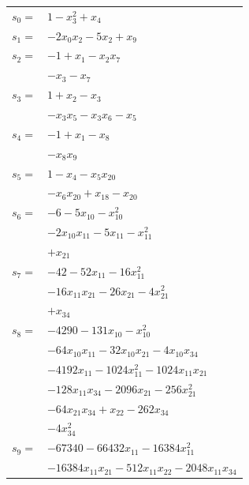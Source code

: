 \begingroup
\small
\setlength{\tabcolsep}{2pt}
\setlength{\LTleft}{0pt}
\begin{longtable}{@{}r@{\;}l@{}}
\(s_{0}=\) & \(\displaystyle 1 -x_{3}^{2} +x_{4}\) \\[3pt]
\(s_{1}=\) & \(\displaystyle -2x_{0}x_{2} -5x_{2} +x_{9}\) \\[3pt]
\(s_{2}=\) & \(\displaystyle -1 +x_{1} -x_{2}x_{7}\) \\
 & \(\displaystyle -x_{3} -x_{7}\) \\[3pt]
\(s_{3}=\) & \(\displaystyle 1 +x_{2} -x_{3}\) \\
 & \(\displaystyle -x_{3}x_{5} -x_{3}x_{6} -x_{5}\) \\[3pt]
\(s_{4}=\) & \(\displaystyle -1 +x_{1} -x_{8}\) \\
 & \(\displaystyle -x_{8}x_{9}\) \\[3pt]
\(s_{5}=\) & \(\displaystyle 1 -x_{4} -x_{5}x_{20}\) \\
 & \(\displaystyle -x_{6}x_{20} +x_{18} -x_{20}\) \\[3pt]
\(s_{6}=\) & \(\displaystyle -6 -5x_{10} -x_{10}^{2}\) \\
 & \(\displaystyle -2x_{10}x_{11} -5x_{11} -x_{11}^{2}\) \\
 & \(\displaystyle +x_{21}\) \\[3pt]
\(s_{7}=\) & \(\displaystyle -42 -52x_{11} -16x_{11}^{2}\) \\
 & \(\displaystyle -16x_{11}x_{21} -26x_{21} -4x_{21}^{2}\) \\
 & \(\displaystyle +x_{34}\) \\[3pt]
\(s_{8}=\) & \(\displaystyle -4290 -131x_{10} -x_{10}^{2}\) \\
 & \(\displaystyle -64x_{10}x_{11} -32x_{10}x_{21} -4x_{10}x_{34}\) \\
 & \(\displaystyle -4192x_{11} -1024x_{11}^{2} -1024x_{11}x_{21}\) \\
 & \(\displaystyle -128x_{11}x_{34} -2096x_{21} -256x_{21}^{2}\) \\
 & \(\displaystyle -64x_{21}x_{34} +x_{22} -262x_{34}\) \\
 & \(\displaystyle -4x_{34}^{2}\) \\[3pt]
\(s_{9}=\) & \(\displaystyle -67340 -66432x_{11} -16384x_{11}^{2}\) \\
 & \(\displaystyle -16384x_{11}x_{21} -512x_{11}x_{22} -2048x_{11}x_{34}\) \\

\end{longtable}

